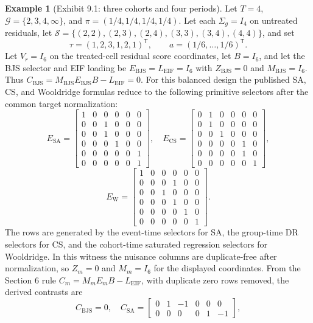 \documentclass[11pt]{article}
\newcommand{\transpose}{\mathsf{T}}
\theoremstyle{definition}
\newtheorem{example}{Example}
\theoremstyle{plain}
\theoremstyle{remark}
\begin{document}
\begin{example}[Exhibit 9.1: three cohorts and four periods]\label{ex:witness}
Let $T=4$, $\mathcal G=\{2,3,4,\infty\}$, and
$\pi=(1/4,1/4,1/4,1/4)$.  Let each $\Sigma_g=I_4$ on untreated residuals,
let $\mathcal S=\{(2,2),(2,3),(2,4),(3,3),(3,4),(4,4)\}$, and set
\[
  \tau=(1,2,3,1,2,1)^\transpose,\qquad
  a=(1/6,\ldots,1/6)^\transpose .
\]
Let $V_r=I_6$ on the treated-cell residual score coordinates, let
$B=I_6$, and let the BJS selector and EIF loading be
$E_{\mathrm{BJS}}=L_{\mathrm{EIF}}=I_6$ with $Z_{\mathrm{BJS}}=0$ and
$M_{\mathrm{BJS}}=I_6$.  Thus
$C_{\mathrm{BJS}}=M_{\mathrm{BJS}}E_{\mathrm{BJS}}B-L_{\mathrm{EIF}}=0$.
For this balanced design the published SA, CS, and Wooldridge formulas reduce
to the following primitive selectors after the common target normalization:
\[
E_{\mathrm{SA}}=
\begin{bmatrix}
1&0&0&0&0&0\\
0&0&1&0&0&0\\
0&0&1&0&0&0\\
0&0&0&1&0&0\\
0&0&0&0&0&1\\
0&0&0&0&0&1
\end{bmatrix},\quad
E_{\mathrm{CS}}=
\begin{bmatrix}
0&1&0&0&0&0\\
0&1&0&0&0&0\\
0&0&1&0&0&0\\
0&0&0&0&1&0\\
0&0&0&0&1&0\\
0&0&0&0&0&1
\end{bmatrix},
\]
\[
E_{\mathrm{W}}=
\begin{bmatrix}
1&0&0&0&0&0\\
0&0&0&1&0&0\\
0&0&1&0&0&0\\
0&0&0&1&0&0\\
0&0&0&0&1&0\\
0&0&0&0&0&1
\end{bmatrix}.
\]
The rows are generated by the event-time selectors for SA, the group-time
DR selectors for CS, and the cohort-time saturated regression selectors for
Wooldridge.  In this witness the nuisance columns are duplicate-free after
normalization, so $Z_m=0$ and $M_m=I_6$ for the displayed coordinates.  From
the Section 6 rule $C_m=M_mE_mB-L_{\mathrm{EIF}}$, with duplicate zero rows
removed, the derived contrasts are
\[
C_{\mathrm{BJS}}=0,\quad
C_{\mathrm{SA}}=\begin{bmatrix}0&1&-1&0&0&0\\0&0&0&0&1&-1\end{bmatrix},
\]
\end{example}
\end{document}
